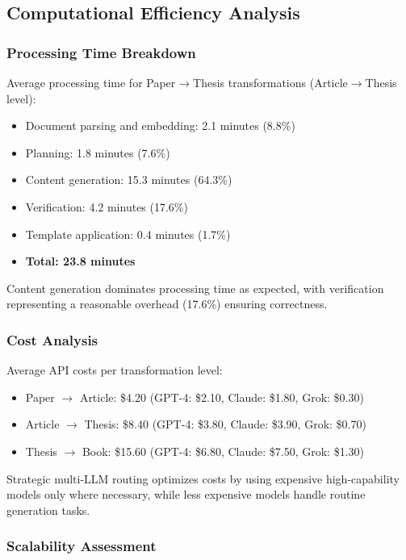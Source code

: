 \documentclass{ieeeaccess}
\begin{document}
\subsection{Computational Efficiency Analysis}

\subsubsection{Processing Time Breakdown}

Average processing time for Paper$\rightarrow$Thesis transformations (Article$\rightarrow$Thesis level):

\begin{itemize}
\item Document parsing and embedding: 2.1 minutes (8.8\%)
\item Planning: 1.8 minutes (7.6\%)
\item Content generation: 15.3 minutes (64.3\%)
\item Verification: 4.2 minutes (17.6\%)
\item Template application: 0.4 minutes (1.7\%)
\item \textbf{Total: 23.8 minutes}
\end{itemize}

Content generation dominates processing time as expected, with verification representing a reasonable overhead (17.6\%) ensuring correctness.

\subsubsection{Cost Analysis}

Average API costs per transformation level:

\begin{itemize}
\item Paper $\rightarrow$ Article: \$4.20 (GPT-4: \$2.10, Claude: \$1.80, Grok: \$0.30)
\item Article $\rightarrow$ Thesis: \$8.40 (GPT-4: \$3.80, Claude: \$3.90, Grok: \$0.70)
\item Thesis $\rightarrow$ Book: \$15.60 (GPT-4: \$6.80, Claude: \$7.50, Grok: \$1.30)
\end{itemize}

Strategic multi-LLM routing optimizes costs by using expensive high-capability models only where necessary, while less expensive models handle routine generation tasks.

\subsubsection{Scalability Assessment}
\end{document}
